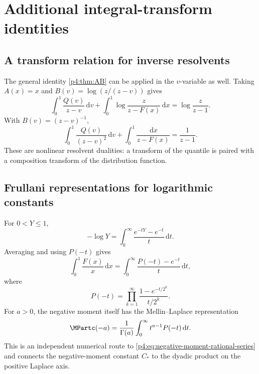 \documentclass[11pt,oneside]{article}
\theoremstyle{definition}
\theoremstyle{remark}
\newcommand{\F}{F}
\newcommand{\Q}{Q}
\newcommand{\dd}{\,\mathrm d}
\newcommand{\1}{\mathbf 1}
\begin{document}
\section{Additional integral-transform identities}

\subsection{A transform relation for inverse resolvents}

The general identity \cref{p4:thm:AB} can be applied in the \(v\)-variable as well.  Taking
\(A(x)=x\) and
\(B(v)=\log(z/(z-v))\) gives
\begin{equation}\label{p4:eq:inverse-log-resolvent}
 \int_0^1\frac{\Q(v)}{z-v}\dd v
 +\int_0^1\log\frac{z}{z-\F(x)}\dd x
 =\log\frac{z}{z-1}.
\end{equation}
With \(B(v)=(z-v)^{-1}\),
\begin{equation}\label{p4:eq:inverse-square-resolvent}
 \int_0^1\frac{\Q(v)}{(z-v)^2}\dd v
 +\int_0^1\frac{\dd x}{z-\F(x)}
 =\frac1{z-1}.
\end{equation}
These are nonlinear resolvent dualities: a transform of the quantile is paired with a
composition transform of the distribution function.

\subsection{Frullani representations for logarithmic constants}

For \(0<Y\le1\),
\begin{equation}\label{p4:eq:Frullani-log}
 -\log Y=\int_0^\infty\frac{e^{-tY}-e^{-t}}t\dd t.
\end{equation}
Averaging and using \(P(-t)\) gives
\begin{equation}\label{p4:eq:log-Frullani-product}
 \int_0^1\frac{\F(x)}x\dd x
 =\int_0^\infty\frac{P(-t)-e^{-t}}t\dd t,
\end{equation}
where
\begin{equation}\label{p4:eq:Pminus-product}
 P(-t)=\prod_{k=1}^{\infty}
 \frac{1-e^{-t/2^k}}{t/2^k}.
\end{equation}
For \(a>0\), the negative moment itself has the Mellin--Laplace representation
\begin{equation}\label{p4:eq:negative-Mellin-Laplace}
 \MPartc(-a)=\frac1{\Gamma(a)}\int_0^\infty t^{a-1}P(-t)\dd t.
\end{equation}
This is an independent numerical route to \cref{p4:eq:negative-moment-rational-series} and
connects the negative-moment constant \(C_*\) to the dyadic product on the positive
Laplace axis.
\end{document}
